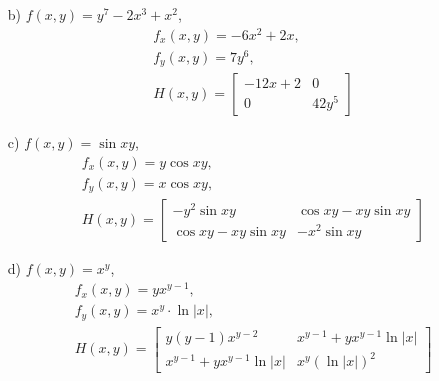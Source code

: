 \begin{solution}
\begin{enumerate}
        \item[b) ] $f(x,y)=y^7-2x^3+x^2$,
        \begin{align*}
            & f_x(x,y) = -6x^2 + 2x, \\
            & f_y(x,y) = 7y^6, \\
            & H(x,y) = \begin{bmatrix}
                -12x+2 & 0 \\
                0 & 42y^5
            \end{bmatrix}
        \end{align*}
        
        \item[c) ] $f(x,y)=\sin{xy}$,
                \begin{align*}
            & f_x(x,y)=y\cos{xy}, \\
            & f_y(x,y)=x\cos{xy},  \\
            & H(x,y) = \begin{bmatrix}
                -y^2 \sin{xy} & \cos{xy} - xy \sin{xy} \\
                \cos{xy} - xy \sin{xy} & -x^2 \sin{xy}
            \end{bmatrix}
        \end{align*}
        
        \item[d) ] $f(x,y)=x^y$,
                        \begin{align*}
            & f_x(x,y)=yx^{y-1}, \\
            & f_y(x,y)=x^{y}\cdot \ln|x|, \\
            & H(x,y) = \begin{bmatrix}
                y(y-1)x^{y-2} & x^{y-1} + yx^{y-1}\ln|x| \\
                x^{y-1} + yx^{y-1}\ln|x| & x^y (\ln|x|)^2
            \end{bmatrix}
        \end{align*}
\end{enumerate}
\end{solution}
\smallskip


